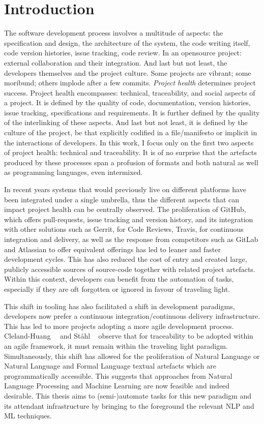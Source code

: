 \chapter{Introduction}
\label{chapter:introduction}

The software development process involves a multitude of aspects: the
specification and design, the architecture of the system, the code writing
itself, code version histories, issue tracking, code review. In an opensource
project: external collaboration and their integration. And last but not least,
the developers themselves and the project culture. Some projects are vibrant;
some moribund; others implode after a few commits. \emph{Project health}
determines project success. Project health encompasses: technical, traceability,
and social aspects of a project. It is defined by the quality of code,
documentation, version histories, issue tracking, specifications and
requirements. It is further defined by the quality of the interlinking of these
aspects. And last but not least, it is defined by the culture of the project, be
that explicitly codified in a file/manifesto or implicit in the interactions of
developers. In this work, I focus only on the first two aspects of project
health: technical and traceability. It is of no surprise that the artefacts
produced by these processes span a profusion of formats and both natural as well
as programming languages, even intermixed.

In recent years systems that would previously live on different platforms have
been integrated under a single umbrella, thus the different aspects that can
impact project health can be centrally observed. The proliferation of GitHub,
which offers pull-requests, issue tracking and version history, and its
integration with other solutions such as Gerrit, for Code Reviews, Travis, for
continuous integration and delivery, as well as the response from competitors
such as GitLab and Atlassian to offer equivalent offerings has led to leaner and
faster development cycles. This has also reduced the cost of entry and created
large, publicly accessible sources of source-code together with related project
artefacts. Within this context, developers can benefit from the automation of
tasks, especially if they are oft forgotten or ignored in favour of traveling
light. 

This shift in tooling has also facilitated a shift in development paradigms,
developers now prefer a continuous integration/continuous delivery
infrastructure. This has led to more projects adopting a more agile development
process. Cleland-Huang~\etal~\cite{Cleland-Huang2014} and St{\aa}hl
\etal~\cite{Stahl2017} observe that for traceability to be adopted within an
agile framework, it must remain within the traveling light paradigm.
Simultaneously, this shift has allowed for the proliferation of Natural Language
or Natural Language and Formal Language textual artefacts which are
programmatically accessible. This suggests that approaches from Natural Language
Processing and Machine Learning are now feasible and indeed desirable. This
thesis aims to (semi-)automate tasks for this new paradigm and its attendant
infrastructure by bringing to the foreground the relevant NLP and ML techniques.

